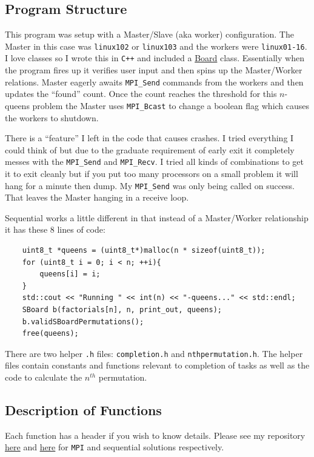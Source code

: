 \documentclass{article}
\begin{document}
\subsection{Program Structure}
This program was setup with a Master/Slave (aka worker) configuration. The 
Master in this case was \verb|linux102| or \verb|linux103| and the workers were 
\verb|linux01-16|. I love classes so I wrote this in \verb|C++| and included a 
\href{}{Board} class. Essentially when the program fires up it verifies user 
input and then spins up the Master/Worker relations. Master eagerly awaits 
\verb|MPI_Send| commands from the workers and then updates the ``found'' count. 
Once the count reaches the threshold for this $n$-queens problem the Master uses 
\verb|MPI_Bcast| to change a boolean flag which causes the workers to shutdown. 

There is a ``feature'' I left in the code that causes crashes. I tried 
everything I could think of but due to the graduate requirement of early exit it 
completely messes with the \verb|MPI_Send| and \verb|MPI_Recv|. I tried all 
kinds of combinations to get it to exit cleanly but if you put too many 
processors on a small problem it will hang for a minute then dump. My 
\verb|MPI_Send| was only being called on success. That leaves the Master hanging 
in a receive loop.

Sequential works a little different in that instead of a Master/Worker 
relationship it has these 8 lines of code:

\begin{verbatim}
    uint8_t *queens = (uint8_t*)malloc(n * sizeof(uint8_t));
    for (uint8_t i = 0; i < n; ++i){
        queens[i] = i;
    }
    std::cout << "Running " << int(n) << "-queens..." << std::endl;
    SBoard b(factorials[n], n, print_out, queens);
    b.validSBoardPermutations();
    free(queens);
\end{verbatim}

There are two helper \verb|.h| files: \verb|completion.h| and 
\verb|nthpermutation.h|. The helper files contain constants and functions 
relevant to completion of tasks as well as the code to calculate the $n^{th}$ 
permutation.

\subsection{Description of Functions}
Each function has a header if you wish to know details. Please see my repository 
\href{https://github.com/macattackftw/HighPerfComputing/tree/master/final}{here} 
and 
\href{https://github.com/macattackftw/HighPerfComputing/tree/master/seqfinal}{here} 
for \verb|MPI| and sequential solutions respectively.
\end{document}
